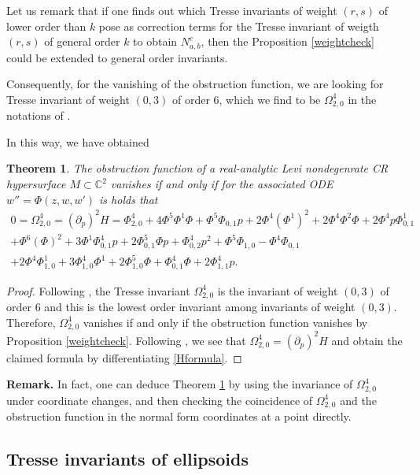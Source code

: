 \documentclass[12pt]{amsart}
\newtheorem{theorem}{Theorem}[section]
\def\CC{\mathbb{C}}
\begin{document}
Let us remark that if one finds out which Tresse invariants of weight $(r,s)$ of lower order than $k$ pose as correction terms for the Tresse invariant of weigth $(r,s)$ of general order $k$ to obtain $N^c_{a,b}$, then the Proposition \ref{weightcheck} could be extended to general order invariants.

Consequently, for the vanishing of the obstruction function, we are looking for Tresse invariant of weight $(0,3)$ of order $6$, which we  find to be $\Omega^4_{2,0}$ in the notations of \cite{Tr96}.

In this way, we have obtained
\begin{theorem}\label{reduction}
The obstruction function of a real-analytic Levi nondegenrate CR hypersurface $M\subset\CC^{2}$ vanishes if and only if for the associated ODE $w''=\Phi(z,w,w')$ is holds that
\begin{multline*}
0=\Omega^4_{2,0}=(\partial_p)^2H=\Phi^4_{2,0}+
4\Phi^5\Phi^1\Phi+\Phi^5\Phi_{0,1}p+2\Phi^4 (\Phi^1)^2+2\Phi^4\Phi^2\Phi+2\Phi^4p\Phi^1_{0,1}\\
+\Phi^6 (\Phi)^2+3\Phi^1 \Phi^4_{0,1}p
+2\Phi^5_{0,1}\Phi p+\Phi^4_{0,2}p^2+\Phi^5\Phi_{1,0}-\Phi^4\Phi_{0,1}\\
+2\Phi^4\Phi^1_{1,0}+3\Phi^4_{1,0}\Phi^1+2\Phi^5_{1,0}\Phi+\Phi^4_{0,1}\Phi+2\Phi^4_{1,1}p.
\end{multline*}
\end{theorem}
\begin{proof}Following  \cite{Tr96}, the Tresse invariant $\Omega^4_{2,0}$ is the invariant of weight $(0,3)$ of order $6$ and this is the lowest order invariant among invariants  of weight $(0,3)$. Therefore, $\Omega^4_{2,0}$ vanishes if and only if the obstruction function vanishes by Proposition \ref{weightcheck}. Following \cite{Tr96}, we see that $\Omega^4_{2,0}=(\partial_p)^2H$ and obtain the claimed formula by differentiating \eqref{Hformula}.
\end{proof}

\medskip

\noindent{} {\bf Remark.} In fact, one can deduce Theorem \ref{reduction} by using the invariance of $\Omega^4_{2,0}$ under coordinate changes, and then checking the coincidence of $\Omega^4_{2,0}$ and the obstruction function in the normal form coordinates at a point directly.

\medskip

\subsection{Tresse invariants of ellipsoids}
\end{document}
